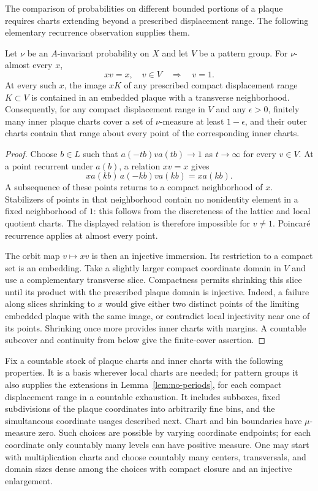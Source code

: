 The comparison of probabilities on different bounded portions of a
plaque requires charts extending beyond a prescribed displacement
range. The following elementary recurrence observation supplies them.

\begin{lemma}\label{lem:no-periods}
Let $\nu$ be an $A$-invariant probability on $X$ and let $V$ be a
pattern group. For $\nu$-almost every $x$,
\[
 xv=x,\quad v\in V \quad\Longrightarrow\quad v=1.
\]
At every such $x$, the image $xK$ of any prescribed compact
displacement range $K\subset V$ is contained in an embedded plaque
with a transverse neighborhood. Consequently, for any compact displacement range in $V$
and any $\epsilon>0$, finitely many inner plaque charts cover a set of
$\nu$-measure at least $1-\epsilon$, and their outer charts contain that
range about every point of the corresponding inner charts.
\end{lemma}

\begin{proof}
Choose $b\in L$ such that $a(-tb)va(tb)\to1$ as $t\to\infty$ for every
$v\in V$. At a point recurrent under $a(b)$, a relation $xv=x$ gives
\[
 xa(kb)\,a(-kb)va(kb)=xa(kb).
\]
A subsequence of these points returns to a compact neighborhood of
$x$. Stabilizers of points in that neighborhood contain no nonidentity
element in a fixed neighborhood of $1$: this follows from the
discreteness of the lattice and local quotient charts. The displayed
relation is therefore impossible for $v\ne1$. Poincar\'e recurrence
applies at almost every point.

The orbit map $v\mapsto xv$ is then an injective immersion. Its
restriction to a compact set is an embedding. Take a slightly larger
compact coordinate domain in $V$ and use a complementary transverse
slice. Compactness permits shrinking this slice until its product
with the prescribed plaque domain is injective. Indeed, a failure
along slices shrinking to $x$ would give either two distinct points
of the limiting embedded plaque with the same image, or contradict
local injectivity near one of its points. Shrinking once more provides
inner charts with margins. A countable subcover and continuity from
below give the finite-cover assertion.
\end{proof}

Fix a countable stock of plaque charts and inner charts with the
following properties. It is a basis wherever local charts are needed;
for pattern groups it also supplies the extensions in
Lemma~\ref{lem:no-periods}, for each compact displacement range in a
countable exhaustion. It includes subboxes, fixed subdivisions of the
plaque coordinates into arbitrarily fine bins, and the simultaneous
coordinate usages described next. Chart and bin boundaries have
$\mu$-measure zero. Such choices are possible by varying coordinate
endpoints; for each coordinate only countably many levels can have
positive measure. One may start with multiplication charts and choose
countably many centers, transversals, and domain sizes dense among
the choices with compact closure and an injective enlargement.

